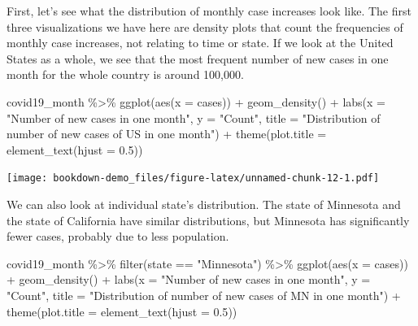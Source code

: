 \documentclass[
]{book}
\newenvironment{Shaded}{\begin{snugshade}}{\end{snugshade}}
\newcommand{\AttributeTok}[1]{\textcolor[rgb]{0.77,0.63,0.00}{#1}}
\newcommand{\FloatTok}[1]{\textcolor[rgb]{0.00,0.00,0.81}{#1}}
\newcommand{\FunctionTok}[1]{\textcolor[rgb]{0.00,0.00,0.00}{#1}}
\newcommand{\NormalTok}[1]{#1}
\newcommand{\SpecialCharTok}[1]{\textcolor[rgb]{0.00,0.00,0.00}{#1}}
\newcommand{\StringTok}[1]{\textcolor[rgb]{0.31,0.60,0.02}{#1}}
\begin{document}
First, let's see what the distribution of monthly case increases look like. The first three visualizations we have here are density plots that count the frequencies of monthly case increases, not relating to time or state. If we look at the United States as a whole, we see that the most frequent number of new cases in one month for the whole country is around 100,000.

\begin{Shaded}
\begin{Highlighting}[]
\NormalTok{covid19\_month }\SpecialCharTok{\%\textgreater{}\%}
  \FunctionTok{ggplot}\NormalTok{(}\FunctionTok{aes}\NormalTok{(}\AttributeTok{x =}\NormalTok{ cases)) }\SpecialCharTok{+}
  \FunctionTok{geom\_density}\NormalTok{() }\SpecialCharTok{+}
  \FunctionTok{labs}\NormalTok{(}\AttributeTok{x =} \StringTok{"Number of new cases in one month"}\NormalTok{, }\AttributeTok{y =} \StringTok{"Count"}\NormalTok{, }\AttributeTok{title =} \StringTok{"Distribution of number of new cases of US in one month"}\NormalTok{) }\SpecialCharTok{+}
  \FunctionTok{theme}\NormalTok{(}\AttributeTok{plot.title =} \FunctionTok{element\_text}\NormalTok{(}\AttributeTok{hjust =} \FloatTok{0.5}\NormalTok{))}
\end{Highlighting}
\end{Shaded}

\texttt{[image: bookdown-demo\_files/figure-latex/unnamed-chunk-12-1.pdf]}

We can also look at individual state's distribution. The state of Minnesota and the state of California have similar distributions, but Minnesota has significantly fewer cases, probably due to less population.

\begin{Shaded}
\begin{Highlighting}[]
\NormalTok{covid19\_month }\SpecialCharTok{\%\textgreater{}\%}
  \FunctionTok{filter}\NormalTok{(state }\SpecialCharTok{==} \StringTok{"Minnesota"}\NormalTok{) }\SpecialCharTok{\%\textgreater{}\%}
  \FunctionTok{ggplot}\NormalTok{(}\FunctionTok{aes}\NormalTok{(}\AttributeTok{x =}\NormalTok{ cases)) }\SpecialCharTok{+}
  \FunctionTok{geom\_density}\NormalTok{() }\SpecialCharTok{+} 
  \FunctionTok{labs}\NormalTok{(}\AttributeTok{x =} \StringTok{"Number of new cases in one month"}\NormalTok{, }\AttributeTok{y =} \StringTok{"Count"}\NormalTok{, }\AttributeTok{title =} \StringTok{"Distribution of number of new cases of MN in one month"}\NormalTok{) }\SpecialCharTok{+}
  \FunctionTok{theme}\NormalTok{(}\AttributeTok{plot.title =} \FunctionTok{element\_text}\NormalTok{(}\AttributeTok{hjust =} \FloatTok{0.5}\NormalTok{))}
\end{Highlighting}
\end{Shaded}
\end{document}
